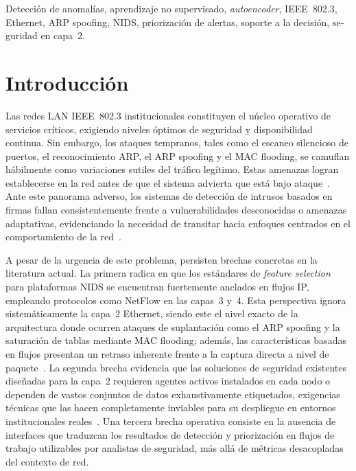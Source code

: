 \documentclass[conference]{IEEEtran}
\begin{document}
\begin{otherlanguage}{spanish}
\renewcommand{\IEEEkeywordsname}{Palabras clave}
\begin{IEEEkeywords}
Detección de anomalías, aprendizaje no supervisado, \textit{autoencoder},
IEEE~802.3, Ethernet, ARP spoofing, NIDS, priorización de alertas,
soporte a la decisión, seguridad en capa~2.
\end{IEEEkeywords}
\end{otherlanguage}

\section{Introducción}

Las redes LAN IEEE~802.3 institucionales constituyen el núcleo operativo
de servicios críticos, exigiendo niveles óptimos de seguridad y
disponibilidad continua. Sin embargo, los ataques tempranos, tales como el escaneo silencioso de
puertos, el reconocimiento ARP, el ARP spoofing y el MAC flooding, se
camuflan hábilmente como variaciones sutiles del tráfico legítimo. Estas amenazas logran establecerse en la red antes de que el
sistema advierta que está bajo ataque~\cite{tufan2021}. Ante este
panorama adverso, los sistemas de detección de intrusos basados en
firmas fallan consistentemente frente a vulnerabilidades desconocidas o
amenazas adaptativas, evidenciando la necesidad de transitar hacia
enfoques centrados en el comportamiento de la red~\cite{gamage2020}.

A pesar de la urgencia de este problema, persisten brechas concretas
en la literatura actual. La primera radica en que los estándares de
\textit{feature selection} para plataformas NIDS se encuentran
fuertemente anclados en flujos IP, empleando protocolos como NetFlow en
las capas~3 y~4. Esta perspectiva ignora sistemáticamente la capa~2
Ethernet, siendo este el nivel exacto de la arquitectura donde ocurren
ataques de suplantación como el ARP spoofing y la saturación de tablas
mediante MAC flooding; además, las características basadas en flujos
presentan un retraso inherente frente a la captura directa a nivel de
paquete~\cite{sarhan2022,he2023}. La segunda brecha evidencia que las
soluciones de seguridad existentes diseñadas para la capa~2 requieren
agentes activos instalados en cada nodo o dependen de vastos conjuntos
de datos exhaustivamente etiquetados, exigencias técnicas que las hacen
completamente inviables para su despliegue en entornos institucionales
reales~\cite{morsy2022,sakhawat2019}. Una tercera brecha operativa
consiste en la ausencia de interfaces que traduzcan los resultados de
detección y priorización en flujos de trabajo utilizables por analistas
de seguridad, más allá de métricas desacopladas del contexto de red.
\end{document}
